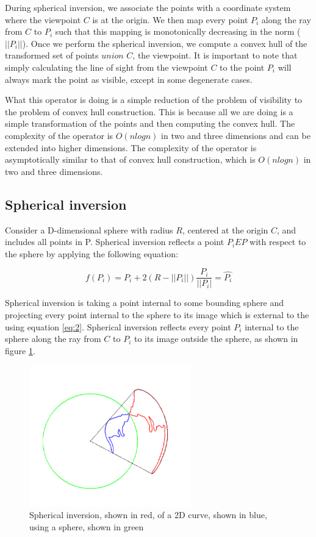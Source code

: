 \documentclass[11pt]{article}
\begin{document}
During spherical inversion, we associate the points with a coordinate system where the viewpoint $C$ is at the origin. We then map every point $ P_{i} $ along the ray from $ C $ to $ P_{i} $ such that this mapping is monotonically decreasing in the norm ($ || P_{i} ||$). Once we perform the spherical inversion, we compute a convex hull of the transformed set of points $ union $ $ C$, the viewpoint. It is important to note that simply calculating the line of sight from the viewpoint $C$ to the point $ P_{i} $ will always mark the point as visible, except in some degenerate cases. 

What this operator is doing is a simple reduction of the problem of visibility to the problem of convex hull construction. This is because all we are doing is a simple transformation of the points and then computing the convex hull. The complexity of the operator is $ O(nlogn) $ in two and three dimensions and can be extended into higher dimensions. The complexity of the operator is asymptotically similar to that of convex hull construction, which is $ O(nlogn) $ in two and three dimensions.

\subsection{Spherical inversion}
Consider a D-dimensional sphere with radius $ R $, centered at the origin $ C $, and includes all points in P. Spherical inversion reflects a point $ P_{i} E P $ with respect to the sphere by applying the following equation: 

\begin{equation}
\label{eq:2}
f(P_{i}) = P_{i} + 2 (R - ||P_{i}||) \dfrac{P_{i}}{||P_{i}|} = \widehat{P_{i}}
\end{equation}

Spherical inversion is taking a point internal to some bounding sphere and projecting every point internal to the sphere to its image which is external to the using equation \ref{eq:2}. Spherical inversion reflects every point $ P_{i} $ internal to the sphere along the ray from $ C $ to $ P_{i} $ to its image outside the sphere, as shown in figure \ref{fig:spherical-inversion-1}. 

\begin{figure}[h]
\includegraphics[width=7cm]{spherical-inversion-1}
\centering
\caption{Spherical inversion, shown in red, of a 2D curve, shown in blue, using a sphere, shown in green \cite{Katz07}}
\label{fig:spherical-inversion-1}
\end{figure}
\end{document}

